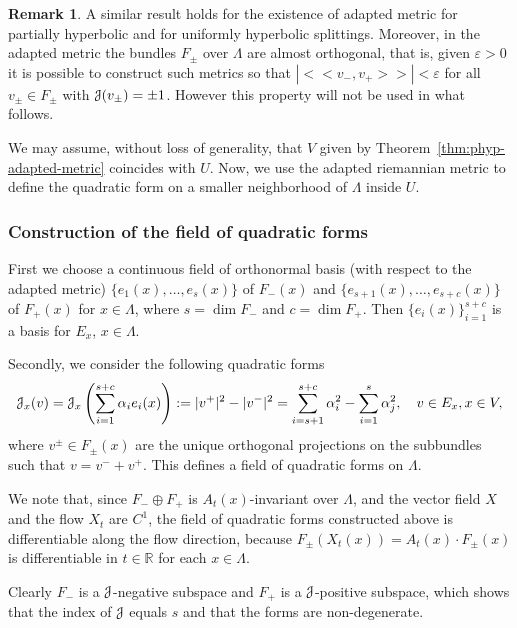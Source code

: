 \documentclass[12pt,reqno]{amsart}
\numberwithin{equation}{section}
\theoremstyle{plain}
\theoremstyle{definition}
\newtheorem{remark}[theorem]{Remark}
\newcommand{\RR}{{\mathbb R}}
\renewcommand{\epsilon}{\varepsilon}
\newcommand{\J}{\EuScript{J}}
\begin{document}
\begin{remark}
  A similar result holds for the existence of adapted metric
  for partially hyperbolic and for uniformly hyperbolic
  splittings. Moreover, in
    the adapted metric the bundles $F_\pm$ over
    $\Lambda$ are almost orthogonal, that is, given
    $\epsilon>0$ it is
    possible to construct such metrics so that
    $|<<v_-,v_+>>|<\epsilon$ for all $v_\pm\in F_\pm$
    with $\J(v_\pm)=\pm1$. However this property will
    not be used in what follows.
\end{remark}

We may assume, without loss of generality, that $V$ given by
Theorem~\ref{thm:phyp-adapted-metric} coincides with $U$.
Now, we use the adapted riemannian metric to define the
quadratic form on a smaller neighborhood of $\Lambda$ inside
$U$.

\subsubsection{Construction of the field of quadratic forms}
\label{sec:constr-field-quadrat}

First we choose a continuous field of orthonormal
basis (with respect to the adapted metric)
$\{e_1(x),\dots, e_s(x)\}$ of $F_-(x)$ and
$\{e_{s+1}(x),\dots, e_{s+c}(x)\}$ of $F_+(x)$ for
$x\in\Lambda$, where $s=\dim F_-$ and $c=\dim
F_+$. Then $\{e_i(x)\}_{i=1}^{s+c}$ is a basis for
$E_x$, $x\in \Lambda$.

Secondly, we consider the following quadratic forms
\begin{align*}
  \J_x(v)=\J_x\left(\sum_{i=1}^{s+c}\alpha_ie_i(x)\right)
  :=|v^+|^2-|v^-|^2
  =
  \sum_{i=s+1}^{s+c} \alpha_i^2 - \sum_{i=1}^s \alpha_j^2,
  \quad v\in E_x , x\in V,
\end{align*}
where $v^\pm\in F_\pm(x)$ are the unique orthogonal
projections on the subbundles such that $v=v^-+v^+$.
This defines a field of quadratic forms on $\Lambda$.

We note that, since $F_-\oplus F_+$ is $A_t(x)$-invariant
over $\Lambda$, and the vector field $X$ and the flow $X_t$
are $C^1$, the field of quadratic forms constructed above is 
differentiable along the flow direction, because
$F_\pm(X_t(x))=A_t(x)\cdot F_\pm(x)$ is differentiable
in $t\in\RR$ for each $x\in\Lambda$.

Clearly $F_-$ is a $\J$-negative subspace and $F_+$ is a
$\J$-positive subspace, which shows that the index of $\J$
equals $s$ and that the forms are non-degenerate.
\end{document}
